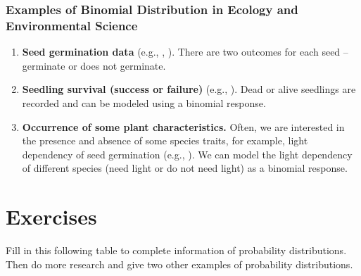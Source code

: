 \documentclass[
]{book}
\begin{document}
\subsubsection{Examples of Binomial Distribution in Ecology and Environmental Science}\label{examples-of-binomial-distribution-in-ecology-and-environmental-science}

\begin{enumerate}
\def\labelenumi{\arabic{enumi}.}
\item
  \textbf{Seed germination data} (e.g., \citet{tiansawat2013}, \citet{yiamthaisong2024}). There are two outcomes for each seed -- germinate or does not germinate.
\item
  \textbf{Seedling survival (success or failure)} (e.g., \citet{naruangsri2023}). Dead or alive seedlings are recorded and can be modeled using a binomial response.
\item
  \textbf{Occurrence of some plant characteristics.} Often, we are interested in the presence and absence of some species traits, for example, light dependency of seed germination (e.g., \citet{tiansawat2013}). We can model the light dependency of different species (need light or do not need light) as a binomial response.
\end{enumerate}

\section{Exercises}\label{exercises-3}

Fill in this following table to complete information of probability distributions. Then do more research and give two other examples of probability distributions.
\end{document}
